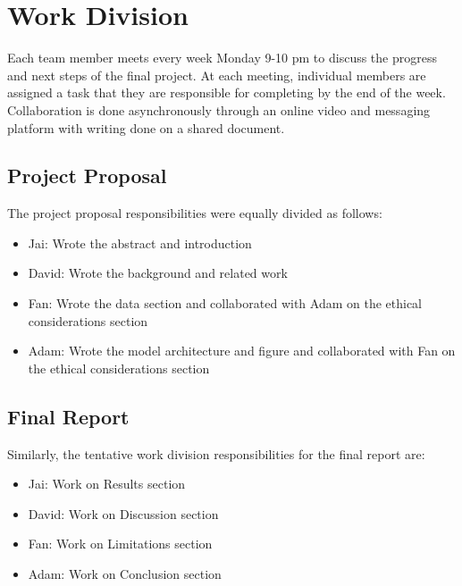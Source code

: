 \documentclass[../main.tex]{subfiles}
\begin{document}
\section{Work Division} 
Each team member meets every week Monday 9-10 pm to 
discuss the progress and next steps of the final project. At each meeting, 
individual members are assigned a task that they are responsible for completing 
by the end of the week. Collaboration is done asynchronously through an online 
video and messaging platform with writing done on a shared document.

\subsection{Project Proposal} 
The project proposal responsibilities were equally divided as follows:

\begin{itemize} 
  \item Jai: Wrote the abstract and introduction 
  \item David: Wrote the background and related work 
  \item Fan: Wrote the data section and collaborated with Adam on the ethical considerations section
  \item Adam: Wrote the model architecture and figure and collaborated with Fan on the ethical considerations section
\end{itemize}

\subsection{Final Report} 

Similarly, the tentative work division responsibilities for the final report are:

\begin{itemize} 
  \item Jai: Work on Results section
  \item David: Work on Discussion section
  \item Fan: Work on Limitations section
  \item Adam: Work on Conclusion section
\end{itemize}
\end{document}
